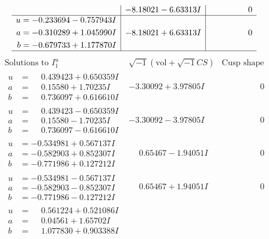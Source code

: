 \documentclass[1p]{elsarticle_modified}
\theoremstyle{definition}
\newcommand{\I}{\sqrt{-1}}
\begin{document}
$$\begin{array}{c|c|c}
 & -8.18021 - 6.63313 I & \phantom{-0.000000 } 0 \\ \hline\begin{aligned}
u &= -0.233694 - 0.757943 I \\
a &= -0.310289 + 1.045990 I \\
b &= -0.679733 + 1.177870 I\end{aligned}
 & -8.18021 + 6.63313 I & \phantom{-0.000000 } 0\\
 \hline 
 \end{array}$$\newpage$$\begin{array}{c|c|c}  
\text{Solutions to }I^u_{1}& \I (\text{vol} + \sqrt{-1}CS) & \text{Cusp shape}\\
 \hline 
\begin{aligned}
u &= \phantom{-}0.439423 + 0.650359 I \\
a &= \phantom{-}0.15580 + 1.70235 I \\
b &= \phantom{-}0.736097 + 0.616610 I\end{aligned}
 & -3.30092 + 3.97805 I & \phantom{-0.000000 } 0 \\ \hline\begin{aligned}
u &= \phantom{-}0.439423 - 0.650359 I \\
a &= \phantom{-}0.15580 - 1.70235 I \\
b &= \phantom{-}0.736097 - 0.616610 I\end{aligned}
 & -3.30092 - 3.97805 I & \phantom{-0.000000 } 0 \\ \hline\begin{aligned}
u &= -0.534981 + 0.567137 I \\
a &= -0.582903 + 0.852307 I \\
b &= -0.771986 + 0.127212 I\end{aligned}
 & \phantom{-}0.65467 - 1.94051 I & \phantom{-0.000000 } 0 \\ \hline\begin{aligned}
u &= -0.534981 - 0.567137 I \\
a &= -0.582903 - 0.852307 I \\
b &= -0.771986 - 0.127212 I\end{aligned}
 & \phantom{-}0.65467 + 1.94051 I & \phantom{-0.000000 } 0 \\ \hline\begin{aligned}
u &= \phantom{-}0.561224 + 0.521086 I \\
a &= \phantom{-}0.04561 + 1.65702 I \\
b &= \phantom{-}1.077830 + 0.903388 I\end{aligned}

\end{array}$$
\end{document}

